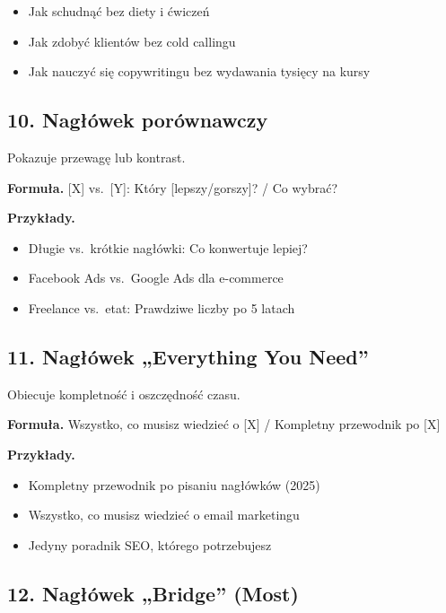 \documentclass[
  12pt,
  a4paper,
  twoside,
  openright,
  12pt,
  DIV=12,
  BCOR=12mm]{scrbook}
\providecommand{\tightlist}{%
  \setlength{\itemsep}{0pt}\setlength{\parskip}{0pt}}\usepackage{longtable,booktabs,array}
\begin{document}
\begin{itemize}
\tightlist
\item
  Jak schudnąć bez diety i ćwiczeń
\item
  Jak zdobyć klientów bez cold callingu
\item
  Jak nauczyć się copywritingu bez wydawania tysięcy na kursy
\end{itemize}

\subsection{10. Nagłówek
porównawczy}\label{nagux142uxf3wek-poruxf3wnawczy}

Pokazuje przewagę lub kontrast.

\textbf{Formuła.} {[}X{]} vs.~{[}Y{]}: Który {[}lepszy/gorszy{]}? / Co
wybrać?

\textbf{Przykłady.}

\begin{itemize}
\tightlist
\item
  Długie vs.~krótkie nagłówki: Co konwertuje lepiej?
\item
  Facebook Ads vs.~Google Ads dla e-commerce
\item
  Freelance vs.~etat: Prawdziwe liczby po 5 latach
\end{itemize}

\subsection{11. Nagłówek „Everything You
Need''}\label{nagux142uxf3wek-everything-you-need}

Obiecuje kompletność i oszczędność czasu.

\textbf{Formuła.} Wszystko, co musisz wiedzieć o {[}X{]} / Kompletny
przewodnik po {[}X{]}

\textbf{Przykłady.}

\begin{itemize}
\tightlist
\item
  Kompletny przewodnik po pisaniu nagłówków (2025)
\item
  Wszystko, co musisz wiedzieć o email marketingu
\item
  Jedyny poradnik SEO, którego potrzebujesz
\end{itemize}

\subsection{12. Nagłówek „Bridge''
(Most)}\label{nagux142uxf3wek-bridge-most}
\end{document}
